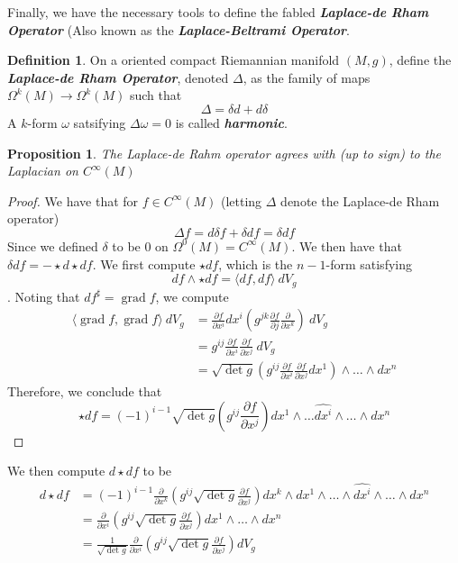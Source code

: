 \documentclass[psamsfonts]{amsart}
\newtheorem{prop}[thm]{Proposition}
\theoremstyle{definition}
\newtheorem{defn}[thm]{Definition}
\theoremstyle{remark}
\newcommand{\ib}[1]{\textbf{\textit{#1}}}
\DeclareMathOperator{\grad}{grad}
\begin{document}
Finally,  we have the necessary tools to define the fabled \ib{Laplace-de Rham Operator} (Also known as the  \ib{Laplace-Beltrami Operator}.
\begin{defn}
On a oriented compact Riemannian manifold $(M,g)$, define the \ib{Laplace-de Rham Operator}, denoted $\Delta$, as  the family of maps $\Omega^k(M) \to \Omega^k(M)$ such that 
$$\Delta = \delta d + d\delta $$
A $k$-form $\omega$ satsifying $\Delta\omega = 0$ is called \ib{harmonic}.
\end{defn}

\begin{prop}
The Laplace-de Rahm operator agrees with (up to sign) to the Laplacian on $C^\infty(M)$
\end{prop}
%
\begin{proof}
We have that for $f \in C^\infty(M)$ (letting $\Delta$ denote the Laplace-de Rham operator)
$$\Delta f  = d\delta f + \delta d f = \delta df$$
Since we defined $\delta$ to be $0$ on $\Omega^0(M) = C^\infty(M)$.
We then have that $\delta df = -\star d\star df$. We first compute $\star df$, which is the $n-1$-form satisfying 
$$df \wedge \star df = \langle df, df \rangle ~dV_g $$. Noting that $df^\sharp = \grad f$, we compute
\begin{align*}
\langle \grad f, \grad f\rangle ~dV_g &= \frac{\partial f}{\partial x^i} dx^i \left( g^{jk}\frac{\partial f}{\partial j}\frac{\partial}{\partial x^k} \right)~dV_g \\
&= g^{ij}\frac{\partial  f}{\partial x^i}\frac{\partial f}{\partial x^j} ~dV_g \\
&= \sqrt{\det g}\left( g^{ij}\frac{\partial  f}{\partial x^i}\frac{\partial f}{\partial x^j} dx^1 \right)\wedge \ldots \wedge dx^n
\end{align*}
Therefore, we conclude that
$$\star df = (-1)^{i-1}\sqrt{\det g} \left(g^{ij}\frac{\partial f}{\partial x^j} \right)dx^1 \wedge \ldots \hat{dx^i} \wedge \ldots \wedge dx^n $$
\end{proof}
We then compute $d\star df$ to be 
\begin{align*}
d\star df &= (-1)^{i-1} \frac{\partial}{\partial x^k}\left( g^{ij}\sqrt{\det g}\frac{\partial f}{\partial x^j} \right) dx^k \wedge dx^1 \wedge \ldots \wedge \hat{dx^i} \wedge \ldots \wedge dx^n \\
&= \frac{\partial}{\partial x^i}\left( g^{ij}\sqrt{\det g}\frac{\partial f}{\partial x^j} \right) dx^1 \wedge \ldots \wedge dx^n \\
&= \frac{1}{\sqrt{\det g}} \frac{\partial}{\partial x^i}\left( g^{ij}\sqrt{\det g}\frac{\partial f}{\partial x^j} \right) dV_g
\end{align*}
\end{document}
